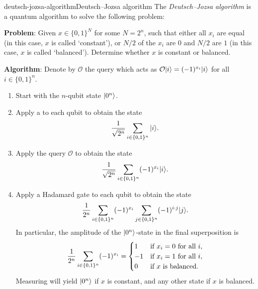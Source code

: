 \begin{topic}{deutsch-jozsa-algorithm}{Deutsch--Jozsa algorithm}
    The \emph{Deutsch--Jozsa algorithm} is a quantum algorithm to solve the following problem:
    
    \textbf{Problem}: Given $x \in \{ 0, 1 \}^N$ for some $N = 2^n$, such that either all $x_i$ are equal (in this case, $x$ is called `constant'), or $N / 2$ of the $x_i$ are $0$ and $N / 2$ are $1$ (in this case, $x$ is called `balanced'). Determine whether $x$ is constant or balanced.
    
    \textbf{Algorithm}: Denote by $\mathcal{O}$ the query which acts as $\mathcal{O} |i\rangle = (-1)^{x_i} |i\rangle$ for all $i \in \{ 0, 1 \}^n$.
    \begin{enumerate}[label=(\arabic*)]
        \item Start with the $n$-qubit state $|0^n\rangle$.
        \item Apply a  to each qubit to obtain the state
        \[ \frac{1}{\sqrt{2^n}} \sum_{i \in \{ 0, 1 \}^n } |i\rangle . \]
        \item Apply the query $\mathcal{O}$ to obtain the state
        \[ \frac{1}{\sqrt{2^n}} \sum_{i \in \{ 0, 1 \}^n} (-1)^{x_i} |i\rangle . \]
        \item Apply a Hadamard gate to each qubit to obtain the state
        \[ \frac{1}{2^n} \sum_{i \in \{ 0, 1 \}^n} (-1)^{x_i} \sum_{j \in \{ 0, 1 \}^n} (-1)^{i \cdot j} |j\rangle . \]
        In particular, the amplitude of the $|0^n\rangle$-state in the final superposition is
        \[ \frac{1}{2^n} \sum_{i \in \{ 0, 1 \}^n} (-1)^{x_i} = \begin{cases}
            1 & \textup{if } x_i = 0 \textup{ for all } i , \\
            -1 & \textup{if } x_i = 1 \textup{ for all } i , \\
            0 & \textup{if } x \textup{ is balanced} .
        \end{cases} \]
        Measuring will yield $|0^n\rangle$ if $x$ is constant, and any other state if $x$ is balanced.
    \end{enumerate}
\end{topic}

